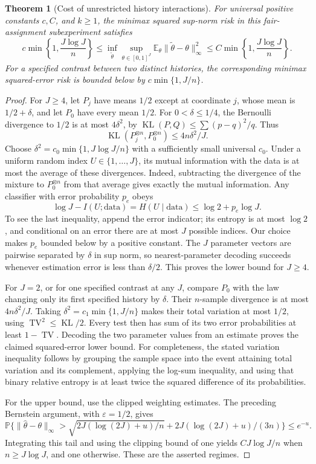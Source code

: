 \documentclass[11pt,a4paper]{article}
\newtheorem{theorem}{Theorem}[section]
\theoremstyle{remark}
\newcommand{\E}{\mathbb E}
\newcommand{\Prob}{\mathbb P}
\DeclareMathOperator{\KL}{KL}
\DeclareMathOperator{\TV}{TV}
\begin{document}
\begin{theorem}[Cost of unrestricted history interactions]
For universal positive constants $c,C$, and $k\ge1$, the minimax squared sup-norm risk in this fair-assignment subexperiment satisfies
\[
 c\min\left\{1,\frac{J\log J}{n}\right\}
 \le \inf_{\widetilde\theta}\sup_{\theta\in[0,1]^J}
 \E_\theta\|\widetilde\theta-\theta\|_\infty^2
 \le C\min\left\{1,\frac{J\log J}{n}\right\}.
\]
For a specified contrast between two distinct histories, the corresponding minimax squared-error risk is bounded below by $c\min\{1,J/n\}$.
\end{theorem}
\begin{proof}
For $J\ge4$, let $P_j$ have means $1/2$ except at coordinate $j$, whose mean is $1/2+\delta$, and let $P_0$ have every mean $1/2$. For $0<\delta\le1/4$, the Bernoulli divergence to $1/2$ is at most $4\delta^2$, by $\KL(P,Q)\le\sum (p-q)^2/q$. Thus
\[
 \KL(P_j^{\otimes n},P_0^{\otimes n})\le4n\delta^2/J.
\]
Choose $\delta^2=c_0\min\{1,J\log J/n\}$ with a sufficiently small universal $c_0$. Under a uniform random index $U\in\{1,\ldots,J\}$, its mutual information with the data is at most the average of these divergences. Indeed, subtracting the divergence of the mixture to $P_0^{\otimes n}$ from that average gives exactly the mutual information. Any classifier with error probability $p_e$ obeys
\[
 \log J-I(U;\text{data})=H(U\mid\text{data})
 \le\log2+p_e\log J.
\]
To see the last inequality, append the error indicator; its entropy is at most $\log2$, and conditional on an error there are at most $J$ possible indices. Our choice makes $p_e$ bounded below by a positive constant. The $J$ parameter vectors are pairwise separated by $\delta$ in sup norm, so nearest-parameter decoding succeeds whenever estimation error is less than $\delta/2$. This proves the lower bound for $J\ge4$.

For $J=2$, or for one specified contrast at any $J$, compare $P_0$ with the law changing only its first specified history by $\delta$. Their $n$-sample divergence is at most $4n\delta^2/J$. Taking $\delta^2=c_1\min\{1,J/n\}$ makes their total variation at most $1/2$, using $\TV^2\le\KL/2$. Every test then has sum of its two error probabilities at least $1-\TV$. Decoding the two parameter values from an estimate proves the claimed squared-error lower bound. For completeness, the stated variation inequality follows by grouping the sample space into the event attaining total variation and its complement, applying the log-sum inequality, and using that binary relative entropy is at least twice the squared difference of its probabilities.

For the upper bound, use the clipped weighting estimates. The preceding Bernstein argument, with $\varepsilon=1/2$, gives
\[
 \Prob\{\|\widehat\theta-\theta\|_\infty>
 \sqrt{2J(\log(2J)+u)/n}+2J(\log(2J)+u)/(3n)\}\le e^{-u}.
\]
Integrating this tail and using the clipping bound of one yields $C J\log J/n$ when $n\ge J\log J$, and one otherwise. These are the asserted regimes.
\end{proof}
\end{document}
